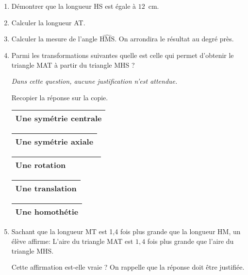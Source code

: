 \begin{enumerate}
\item Démontrer que la longueur HS est égale à $12$~cm.
\item Calculer la longueur AT.
\item Calculer la mesure de l'angle $\widehat{\text{HMS}}$. On arrondira le résultat au degré près.
\item Parmi les transformations suivantes quelle est celle qui permet d'obtenir le triangle MAT à partir du triangle MHS ?

\emph{Dans cette question, aucune justification n'est attendue.}

Recopier la réponse sur la copie.


\begin{minipage}{2.35cm}
\begin{tabular}{|m{2.35cm}|}\hline
Une symétrie centrale\\ \hline
\end{tabular}
\end{minipage}\quad
\begin{minipage}{2.35cm}
\begin{tabular}{|m{2.35cm}|}\hline
Une symétrie axiale\\ \hline
\end{tabular}
\end{minipage}\quad
\begin{minipage}{2.15cm}
\begin{tabular}{|m{2.15cm}|}\hline
Une rotation~~~~~~~\\ \hline
\end{tabular}
\end{minipage}\quad
\begin{minipage}{2.35cm}
\begin{tabular}{|m{2.35cm}|}\hline
Une translation\\ \hline
\end{tabular}
\end{minipage}\quad
\begin{minipage}{2.35cm}
\begin{tabular}{|m{2.35cm}|}\hline
Une homothétie\\ \hline
\end{tabular}
\end{minipage}

\item Sachant que la longueur MT est 1,4 fois plus grande que la longueur HM, un élève affirme: \og L'aire du triangle MAT est $1,4$ fois plus grande que l'aire du triangle MHS. \fg

Cette affirmation est-elle vraie ? On rappelle que la réponse doit être justifiée.
\end{enumerate}

\bigskip

